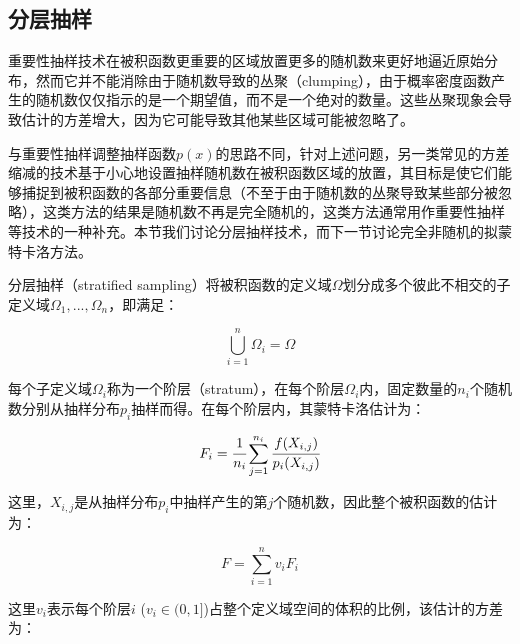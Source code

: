 \subsection{分层抽样}
重要性抽样技术在被积函数更重要的区域放置更多的随机数来更好地逼近原始分布，然而它并不能消除由于随机数导致的丛聚（clumping），由于概率密度函数产生的随机数仅仅指示的是一个期望值，而不是一个绝对的数量。这些丛聚现象会导致估计的方差增大，因为它可能导致其他某些区域可能被忽略了。

与重要性抽样调整抽样函数$p(x)$的思路不同，针对上述问题，另一类常见的方差缩减的技术基于小心地设置抽样随机数在被积函数区域的放置，其目标是使它们能够捕捉到被积函数的各部分重要信息（不至于由于随机数的丛聚导致某些部分被忽略），这类方法的结果是随机数不再是完全随机的，这类方法通常用作重要性抽样等技术的一种补充。本节我们讨论分层抽样技术，而下一节讨论完全非随机的拟蒙特卡洛方法。

分层抽样（stratified sampling）将被积函数的定义域$\Omega$划分成多个彼此不相交的子定义域$\Omega_1,...,\Omega_n$，即满足：

\begin{equation}
	\bigcup_{i=1}^{n}\Omega_i=\Omega
\end{equation}

\noindent 每个子定义域$\Omega_i$称为一个阶层（stratum），在每个阶层$\Omega_i$内，固定数量的$n_i$个随机数分别从抽样分布$p_i$抽样而得。在每个阶层内，其蒙特卡洛估计为：

\begin{equation}
	F_i= \cfrac{1}{n_i}\sum_{j=1}^{n_i} \cfrac{f(X_{i,j})}{p_i(X_{i,j})}
\end{equation} 

\noindent 这里，$X_{i,j}$是从抽样分布$p_i$中抽样产生的第$j$个随机数，因此整个被积函数的估计为：

\begin{equation}
	F=\sum_{i=1}^{n}v_iF_i
\end{equation}

\noindent 这里$v_i$表示每个阶层$i$ ($v_i\in(0,1]$)占整个定义域空间的体积的比例，该估计的方差为：

